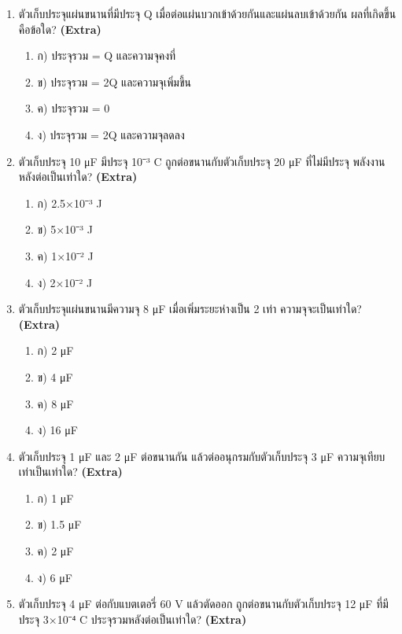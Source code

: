 \documentclass[12pt]{article}
\begin{document}
\begin{enumerate}[label=\arabic*.]
\begin{enumerate}[label=)]
\item ก) 0.125 J
\item ข) 0.0625 J
\item ค) 0.25 J
\item ง) 0.5 J
\end{enumerate}
\item ตัวเก็บประจุแผ่นขนานที่มีประจุ Q เมื่อต่อแผ่นบวกเข้าด้วยกันและแผ่นลบเข้าด้วยกัน ผลที่เกิดขึ้นคือข้อใด? \hfill \textbf{\small (Extra)}
\begin{enumerate}[label=)]
\item ก) ประจุรวม = Q และความจุคงที่
\item ข) ประจุรวม = 2Q และความจุเพิ่มขึ้น
\item ค) ประจุรวม = 0
\item ง) ประจุรวม = 2Q และความจุลดลง
\end{enumerate}
\item ตัวเก็บประจุ 10 μF มีประจุ 10⁻³ C ถูกต่อขนานกับตัวเก็บประจุ 20 μF ที่ไม่มีประจุ พลังงานหลังต่อเป็นเท่าใด? \hfill \textbf{\small (Extra)}
\begin{enumerate}[label=)]
\item ก) 2.5×10⁻³ J
\item ข) 5×10⁻³ J
\item ค) 1×10⁻² J
\item ง) 2×10⁻² J
\end{enumerate}
\item ตัวเก็บประจุแผ่นขนานมีความจุ 8 μF เมื่อเพิ่มระยะห่างเป็น 2 เท่า ความจุจะเป็นเท่าใด? \hfill \textbf{\small (Extra)}
\begin{enumerate}[label=)]
\item ก) 2 μF
\item ข) 4 μF
\item ค) 8 μF
\item ง) 16 μF
\end{enumerate}
\item ตัวเก็บประจุ 1 μF และ 2 μF ต่อขนานกัน แล้วต่ออนุกรมกับตัวเก็บประจุ 3 μF ความจุเทียบเท่าเป็นเท่าใด? \hfill \textbf{\small (Extra)}
\begin{enumerate}[label=)]
\item ก) 1 μF
\item ข) 1.5 μF
\item ค) 2 μF
\item ง) 6 μF
\end{enumerate}
\item ตัวเก็บประจุ 4 μF ต่อกับแบตเตอรี่ 60 V แล้วตัดออก ถูกต่อขนานกับตัวเก็บประจุ 12 μF ที่มีประจุ 3×10⁻⁴ C ประจุรวมหลังต่อเป็นเท่าใด? \hfill \textbf{\small (Extra)}

\end{enumerate}
\end{document}
